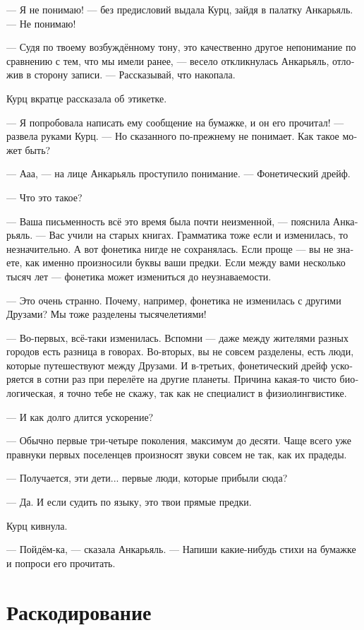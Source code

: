\documentclass[a4paper,10pt,fleqn]{book}\usepackage{polyglossia}\setdefaultlanguage[babelshorthands=true]{russian}\setotherlanguage{english}\defaultfontfeatures{Ligatures=TeX,Mapping=tex-text}\usepackage{xcolor}\newcommand{\ml}[3]{#2}
\begin{document}
--- Я не понимаю! --- без предисловий выдала Курц, зайдя в палатку Анкарьяль.
--- Не понимаю!

--- Судя по твоему возбуждённому тону, это качественно другое непонимание по сравнению с тем, что мы имели ранее, --- весело откликнулась Анкарьяль, отложив в сторону записи.
--- Рассказывай, что накопала.

Курц вкратце рассказала об этикетке.

--- Я попробовала написать ему сообщение на бумажке, и он его прочитал! --- развела руками Курц.
--- Но сказанного по-прежнему не понимает.
Как такое может быть?

--- Ааа, --- на лице Анкарьяль проступило понимание.
--- Фонетический дрейф.

--- Что это такое?

--- Ваша письменность всё это время была почти неизменной, --- пояснила Анкарьяль.
--- Вас учили на старых книгах.
Грамматика тоже если и изменилась, то незначительно.
А вот фонетика нигде не сохранялась.
Если проще --- вы не знаете, как именно произносили буквы ваши предки.
Если между вами несколько тысяч лет --- фонетика может измениться до неузнаваемости.

--- Это очень странно.
Почему, например, фонетика не изменилась с другими Друзами?
Мы тоже разделены тысячелетиями!

--- Во-первых, всё-таки изменилась.
Вспомни --- даже между жителями разных городов есть разница в говорах.
Во-вторых, вы не совсем разделены, есть люди, которые путешествуют между Друзами.
И в-третьих, фонетический дрейф ускоряется в сотни раз при перелёте на другие планеты.
Причина какая-то чисто биологическая, я точно тебе не скажу, так как не специалист в физиолингвистике.

--- И как долго длится ускорение?

--- Обычно первые три-четыре поколения, максимум до десяти.
Чаще всего уже правнуки первых поселенцев произносят звуки совсем не так, как их прадеды.

--- Получается, эти дети... первые люди, которые прибыли сюда?

--- Да.
И если судить по языку, это твои прямые предки.

Курц кивнула.

--- Пойдём-ка, --- сказала Анкарьяль.
--- Напиши какие-нибудь стихи на бумажке и попроси его прочитать.

\section{Раскодирование}
\end{document}
